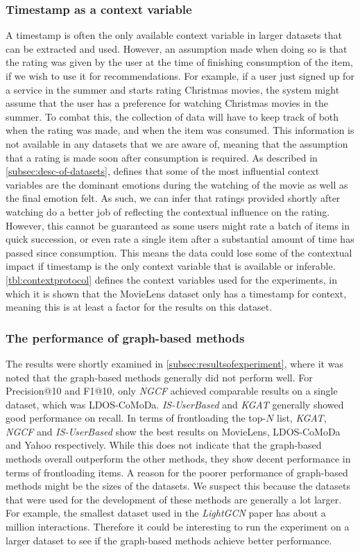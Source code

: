 \subsubsection{Timestamp as a context variable}
A timestamp is often the only available context variable in larger datasets that can be extracted and used.
However, an assumption made when doing so is that the rating was given by the user at the time of finishing consumption of the item, if we wish to use it for recommendations.
For example, if a user just signed up for a service in the summer and starts rating Christmas movies, the system might assume that the user has a preference for watching Christmas movies in the summer.
To combat this, the collection of data will have to keep track of both when the rating was made, and when the item was consumed.
This information is not available in any datasets that we are aware of, meaning that the assumption that a rating is made soon after consumption is required.
As described in \autoref{subsec:desc-of-datasets}, \cite{COMODA2013} defines that some of the most influential context variables are the dominant emotions during the watching of the movie as well as the final emotion felt.
As such, we can infer that ratings provided shortly after watching do a better job of reflecting the contextual influence on the rating.
However, this cannot be guaranteed as some users might rate a batch of items in quick succession, or even rate a single item after a substantial amount of time has passed since consumption.
This means the data could lose some of the contextual impact if timestamp is the only context variable that is available or inferable.
\autoref{tbl:contextprotocol} defines the context variables used for the experiments, in which it is shown that the MovieLens dataset only has a timestamp for context, meaning this is at least a factor for the results on this dataset. 

\subsubsection{The performance of graph-based methods} 
The results were shortly examined in \autoref{subsec:resultsofexperiment}, where it was noted that the graph-based methods generally did not perform well.
For Precision@10 and F1@10, only \textit{NGCF} achieved comparable results on a single dataset, which was LDOS-CoMoDa.
\textit{IS-UserBased} and \textit{KGAT} generally showed good performance on recall.
In terms of frontloading the top-$N$ list, \textit{KGAT}, \textit{NGCF} and \textit{IS-UserBased} show the best results on MovieLens, LDOS-CoMoDa and Yahoo respectively.
While this does not indicate that the graph-based methods overall outperform the other methods, they show decent performance in terms of frontloading items.
A reason for the poorer performance of graph-based methods might be the sizes of the datasets.
We suspect this because the datasets that were used for the development of these methods are generally a lot larger.
For example, the smallest dataset used in the \textit{LightGCN}\cite{LightGCN} paper has about a million interactions.
Therefore it could be interesting to run the experiment on a larger dataset to see if the graph-based methods achieve better performance.
